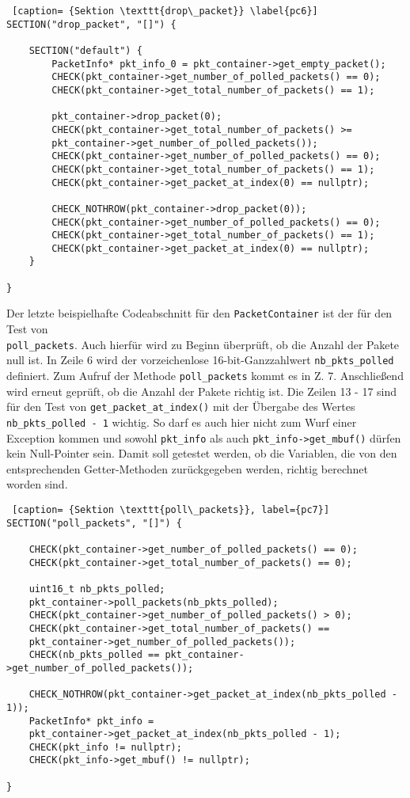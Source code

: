 \documentclass[../review_3.tex]{subfiles}
\begin{document}
\begin{lstlisting} [caption= {Sektion \texttt{drop\_packet}} \label{pc6}]
SECTION("drop_packet", "[]") {
    
    SECTION("default") {
        PacketInfo* pkt_info_0 = pkt_container->get_empty_packet();
        CHECK(pkt_container->get_number_of_polled_packets() == 0);
        CHECK(pkt_container->get_total_number_of_packets() == 1);
        
        pkt_container->drop_packet(0);
        CHECK(pkt_container->get_total_number_of_packets() >=
        pkt_container->get_number_of_polled_packets());
        CHECK(pkt_container->get_number_of_polled_packets() == 0);
        CHECK(pkt_container->get_total_number_of_packets() == 1);
        CHECK(pkt_container->get_packet_at_index(0) == nullptr);
        
        CHECK_NOTHROW(pkt_container->drop_packet(0));
        CHECK(pkt_container->get_number_of_polled_packets() == 0);
        CHECK(pkt_container->get_total_number_of_packets() == 1);
        CHECK(pkt_container->get_packet_at_index(0) == nullptr);
    }
        
}\end{lstlisting}

Der letzte beispielhafte Codeabschnitt für den \texttt{PacketContainer} ist der für den Test von\\ \texttt{poll\_packets}. Auch hierfür wird zu Beginn überprüft, ob die Anzahl der Pakete null ist. In Zeile 6 wird der vorzeichenlose 16-bit-Ganzzahlwert \texttt{nb\_pkts\_polled} definiert. Zum Aufruf der Methode \texttt{poll\_packets} kommt es in Z. 7. Anschließend wird erneut geprüft, ob die Anzahl der Pakete richtig ist. Die Zeilen 13 - 17 sind für den Test von \texttt{get\_packet\_at\_index()} mit der Übergabe des Wertes \texttt{nb\_pkts\_polled - 1} wichtig. So darf es auch hier nicht zum Wurf einer Exception kommen und sowohl \texttt{pkt\_info} als auch \texttt{pkt\_info->get\_mbuf()} dürfen kein Null-Pointer sein. Damit soll getestet werden, ob die Variablen, die von den entsprechenden Getter-Methoden zurückgegeben werden, richtig berechnet worden sind.

\begin{lstlisting} [caption= {Sektion \texttt{poll\_packets}}, label={pc7}]
SECTION("poll_packets", "[]") {
    
    CHECK(pkt_container->get_number_of_polled_packets() == 0);
    CHECK(pkt_container->get_total_number_of_packets() == 0);
    
    uint16_t nb_pkts_polled;
    pkt_container->poll_packets(nb_pkts_polled);
    CHECK(pkt_container->get_number_of_polled_packets() > 0);
    CHECK(pkt_container->get_total_number_of_packets() ==
    pkt_container->get_number_of_polled_packets());
    CHECK(nb_pkts_polled == pkt_container->get_number_of_polled_packets());
    
    CHECK_NOTHROW(pkt_container->get_packet_at_index(nb_pkts_polled - 1));
    PacketInfo* pkt_info =
    pkt_container->get_packet_at_index(nb_pkts_polled - 1);
    CHECK(pkt_info != nullptr);
    CHECK(pkt_info->get_mbuf() != nullptr);

}\end{lstlisting}
\end{document}
